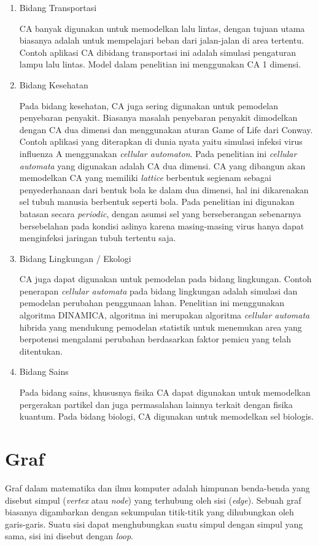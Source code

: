 		\begin{enumerate}
			\item Bidang Transportasi
			
			CA banyak digunakan untuk memodelkan lalu lintas, dengan tujuan utama biasanya adalah untuk mempelajari beban dari jalan-jalan di area tertentu. Contoh aplikasi CA dibidang transportasi ini adalah simulasi pengaturan lampu lalu lintas. Model dalam penelitian ini menggunakan CA 1 dimensi.
			
			\item Bidang Kesehatan
			
			Pada bidang kesehatan, CA juga sering digunakan untuk pemodelan penyebaran penyakit. Biasanya masalah penyebaran penyakit dimodelkan dengan CA dua dimensi dan menggunakan aturan Game of Life dari Conway. Contoh aplikasi yang diterapkan di dunia nyata yaitu simulasi infeksi virus influenza A menggunakan \textit{cellular automaton}. Pada penelitian ini \textit{cellular automata} yang digunakan adalah CA dua dimensi. CA yang dibangun akan memodelkan CA yang memiliki \textit{lattice} berbentuk segienam sebagai penyederhanaan dari bentuk bola ke dalam dua dimensi, hal ini dikarenakan sel tubuh manusia berbentuk seperti bola. Pada penelitian ini digunakan batasan secara \textit{periodic}, dengan asumsi sel yang berseberangan sebenarnya bersebelahan pada kondisi aslinya karena masing-masing virus hanya dapat menginfeksi jaringan tubuh tertentu saja. \cite{referensiCA1}
			
			\item Bidang Lingkungan / Ekologi
			
			CA juga dapat digunakan untuk pemodelan pada bidang lingkungan. Contoh penerapan \textit{cellular automata} pada bidang lingkungan adalah simulasi dan pemodelan perubahan penggunaan lahan. Penelitian ini menggunakan algoritma DINAMICA, algoritma ini merupakan algoritma \textit{cellular automata} hibrida yang mendukung pemodelan statistik untuk menemukan area yang berpotensi mengalami perubahan berdasarkan faktor pemicu yang telah ditentukan.
			
			\item Bidang Sains
			
			Pada bidang sains, khususnya fisika CA dapat digunakan untuk memodelkan pergerakan partikel dan juga permasalahan lainnya terkait dengan fisika kuantum. Pada bidang biologi, CA digunakan untuk memodelkan sel biologis.
		\end{enumerate}
		
\section{Graf}
\label{sec:graf}
Graf dalam matematika dan ilmu komputer adalah himpunan benda-benda yang disebut simpul (\textit{vertex} atau \textit{node}) yang terhubung oleh sisi (\textit{edge}). Sebuah graf biasanya digambarkan dengan sekumpulan titik-titik yang dihubungkan oleh garis-garis. Suatu sisi dapat menghubungkan suatu simpul dengan simpul yang sama, sisi ini disebut dengan \textit{loop}.

